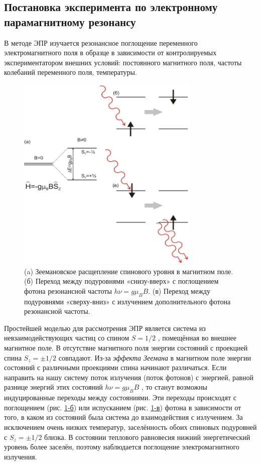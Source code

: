 \documentclass[a4paper,12pt]{article}
\begin{document}
\subsection{Постановка эксперимента по электронному парамагнитному резонансу}
В методе ЭПР изучается резонансное поглощение переменного электромагнитного поля в
образце в зависимости от контролируемых экспериментатором внешних условий:
постоянного магнитного поля, частоты колебаний переменного поля, температуры.
\begin{figure}[H]\label{fig: Zeeman effect}
    \centering
    \includegraphics[width = 0.78\textwidth]{Zeeman effect.png}
    \caption{(a) Зеемановское расщепление спинового уровня в магнитном поле. (б) Переход
        между подуровнями «снизу-вверх» с поглощением фотона резонансной частоты $h\nu = g \mu_B B$. (в) Переход между подуровнями «сверху-вниз» с излучением дополнительного фотона резонансной частоты.}
\end{figure}


Простейшей моделью для рассмотрения ЭПР является система из невзаимодействующих
частиц со спином $S= 1 / 2$ , помещённая во внешнее магнитное поле. В отсутствие
магнитного поля энергии состояний с проекцией спина $S_z = \pm 1 / 2$ совпадают. Из-за \textit{эффекта Зеемана} в магнитном поле энергии состояний с различными проекциями спина начинают различаться. Если направить на нашу систему поток излучения (поток фотонов) с энергией, равной разнице энергий этих состояний $h\nu = g \mu_B B$ , то станут возможны индуцированные переходы между состояниями. Эти переходы происходят с поглощением (рис. \hyperref[fig: Zeeman effect]{1-б}) или испусканием (рис. \hyperref[fig: Zeeman effect]{1-в}) фотона в зависимости от того, в каком из состояний была система до взаимодействия с излучением. За исключением очень низких температур, заселённость обоих спиновых подуровней с $S_z = \pm 1 / 2$ близка. В состоянии теплового равновесия нижний энергетический уровень более заселён, поэтому наблюдается поглощение электромагнитного излучения. 
\end{document}
